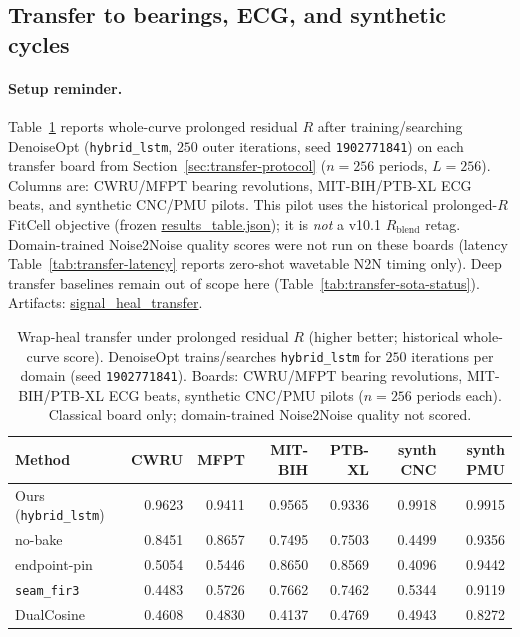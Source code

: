 \subsection{Transfer to bearings, ECG, and synthetic cycles}
\label{sec:transfer-main}

\paragraph{Setup reminder.}
Table~\ref{tab:transfer-main} reports whole-curve prolonged residual $R$ after training/searching DenoiseOpt
(\texttt{hybrid\_lstm}, $250$ outer iterations, seed \texttt{1902771841}) on each transfer board
from Section~\ref{sec:transfer-protocol} ($n{=}256$ periods, $L{=}256$).
Columns are: CWRU/MFPT bearing revolutions, MIT-BIH/PTB-XL ECG beats, and synthetic CNC/PMU pilots.
This pilot uses the historical prolonged-$R$ FitCell objective (frozen
\href{https://github.com/reeldemo/reelsynth/blob/main/brand/artifacts/signal_heal_transfer/results_table.json}{results\_table.json});
it is \emph{not} a v10.1 $R_{\mathrm{blend}}$ retag.
Domain-trained Noise2Noise quality scores were not run on these boards
(latency Table~\ref{tab:transfer-latency} reports zero-shot wavetable N2N timing only).
Deep transfer baselines remain out of scope here (Table~\ref{tab:transfer-sota-status}).
Artifacts:
\href{https://github.com/reeldemo/reelsynth/tree/main/brand/artifacts/signal_heal_transfer}{signal\_heal\_transfer}.

\begin{table}[t]
  \centering
  \caption{Wrap-heal transfer under prolonged residual $R$ (higher better; historical whole-curve score).
    DenoiseOpt trains/searches \texttt{hybrid\_lstm} for $250$ iterations per domain (seed \texttt{1902771841}).
    Boards: CWRU/MFPT bearing revolutions, MIT-BIH/PTB-XL ECG beats, synthetic CNC/PMU pilots
    ($n{=}256$ periods each). Classical board only; domain-trained Noise2Noise quality not scored.}
  \label{tab:transfer-main}
  \setlength{\tabcolsep}{2.8pt}
  \begin{tabular}{@{}lrrrrrr@{}}
    \toprule
    Method & CWRU & MFPT & MIT-BIH & PTB-XL & synth CNC & synth PMU \\
    \midrule
    Ours (\texttt{hybrid\_lstm}) & 0.9623 & 0.9411 & 0.9565 & 0.9336 & 0.9918 & 0.9915 \\
    no-bake & 0.8451 & 0.8657 & 0.7495 & 0.7503 & 0.4499 & 0.9356 \\
    endpoint-pin & 0.5054 & 0.5446 & 0.8650 & 0.8569 & 0.4096 & 0.9442 \\
    \texttt{seam\_fir3} & 0.4483 & 0.5726 & 0.7662 & 0.7462 & 0.5344 & 0.9119 \\
    DualCosine & 0.4608 & 0.4830 & 0.4137 & 0.4769 & 0.4943 & 0.8272 \\
    \bottomrule
  \end{tabular}
\end{table}


